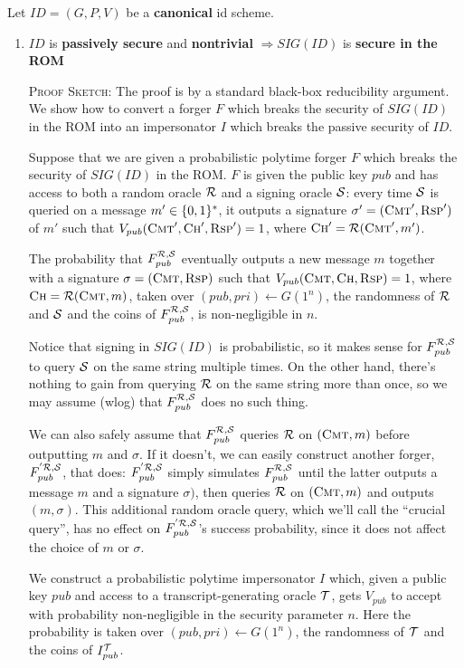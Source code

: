 \documentclass[12pt,twoside]{article}
\begin{document}
\bigskip\noindent
Let $ID = (G,P,V)$ be a {\bf canonical} id scheme.
\begin{enumerate}
\item $ID$ is {\bf passively secure} and {\bf nontrivial} $\Rightarrow SIG(ID)$ is {\bf secure in the ROM}

\textsc{Proof Sketch}: The proof is by a standard black-box reducibility 
argument. We show how to convert a forger $F$ which breaks the security of
$SIG(ID)$ in the ROM into an impersonator $I$ which breaks the passive
security of $ID$.

Suppose that we are given a probabilistic polytime forger $F$ which breaks the
security of $SIG(ID)$ in the ROM. $F$ is given the public key $pub$ and has 
access to both a random oracle $\mathcal{R}$ and a signing oracle $\mathcal{S}$: every time 
$\mathcal{S}$ is queried on a message $m' \in \{0,1\}^{*}$, it outputs a signature 
$\sigma' = (\textsc{Cmt}',\textsc{Rsp}')$ of $m'$ such that 
$V_{pub}(\textsc{Cmt}',\textsc{Ch}',\textsc{Rsp}') = 1$, where 
$\textsc{Ch}' = \mathcal{R}(\textsc{Cmt}',m')$. 

The probability that $F_{pub}^{\mathcal{R},\mathcal{S}}$ eventually outputs a new message 
$m$ together with a signature $\sigma = (\textsc{Cmt},\textsc{Rsp})$ 
such that $V_{pub}(\textsc{Cmt},\textsc{Ch},\textsc{Rsp}) = 1$, where 
$\textsc{Ch} = \mathcal{R}(\textsc{Cmt},m)$, taken over $(pub,pri) \gets G(1^n)$, 
the randomness of $\mathcal{R}$ and $\mathcal{S}$ and the coins of $F_{pub}^{\mathcal{R},\mathcal{S}}$,
is non-negligible in $n$. 

Notice that signing in $SIG(ID)$ is probabilistic, so it makes sense for
$F^{\mathcal{R},\mathcal{S}}_{pub}$ to query $\mathcal{S}$ on the same string multiple times. 
On the other hand, there's nothing to gain from querying $\mathcal{R}$ on the same
string more than once, so we may assume (wlog) that $F^{\mathcal{R},\mathcal{S}}_{pub}$ 
does no such thing. 

We can also safely assume that $F_{pub}^{\mathcal{R},\mathcal{S}}$ queries $\mathcal{R}$ on
$(\textsc{Cmt},m)$ before outputting $m$ and $\sigma$. If it doesn't, we can
easily construct another forger, $F_{pub}^{'\mathcal{R},\mathcal{S}}$, that does: 
$F_{pub}^{'\mathcal{R},\mathcal{S}}$ simply simulates $F_{pub}^{\mathcal{R},\mathcal{S}}$ until the 
latter outputs a message $m$ and a signature $\sigma)$, then queries $\mathcal{R}$ on 
$(\textsc{Cmt},m)$ and outputs $(m,\sigma)$. This additional random oracle 
query, which we'll call the ``crucial query'', has no effect on 
$F_{pub}^{'\mathcal{R},\mathcal{S}}$'s success probability, since it does not affect the 
choice of $m$ or $\sigma$. 

We construct a probabilistic polytime impersonator $I$ which, given a public
key $pub$ and access to a transcript-generating oracle $\mathcal{T}$, gets $V_{pub}$
to accept with probability non-negligible in the security parameter $n$. Here 
the probability is taken over $(pub,pri) \gets G(1^n)$, the randomness of 
$\mathcal{T}$ and the coins of $I_{pub}^{\mathcal{T}}$.


\end{enumerate}
\end{document}
